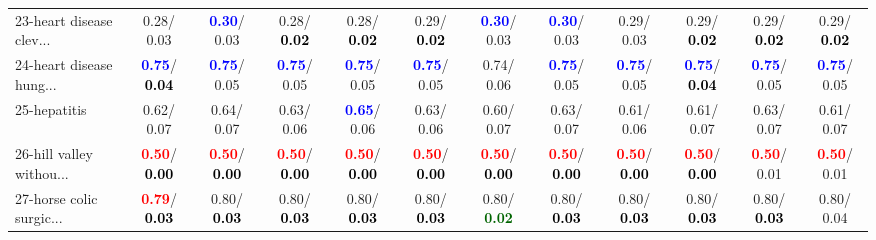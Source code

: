 \begin{table}[h]
\begin{center}
{\begin{tabular}{lc|c|c|c|c|c|c|c|c|c|c}
23-heart disease clev... &   0.28/  0.03 & \textcolor{blue}{\textbf{  0.30}}/  0.03 &   0.28/\textcolor{black}{\textbf{  0.02}} &   0.28/\textcolor{black}{\textbf{  0.02}} &   0.29/\textcolor{black}{\textbf{  0.02}} & \textcolor{blue}{\textbf{  0.30}}/  0.03 & \textcolor{blue}{\textbf{  0.30}}/  0.03 &   0.29/  0.03 &   0.29/\textcolor{black}{\textbf{  0.02}} &   0.29/\textcolor{black}{\textbf{  0.02}} &   0.29/\textcolor{black}{\textbf{  0.02}} \\
24-heart disease hung... & \textcolor{blue}{\textbf{  0.75}}/\textcolor{black}{\textbf{  0.04}} & \textcolor{blue}{\textbf{  0.75}}/  0.05 & \textcolor{blue}{\textbf{  0.75}}/  0.05 & \textcolor{blue}{\textbf{  0.75}}/  0.05 & \textcolor{blue}{\textbf{  0.75}}/  0.05 &   0.74/  0.06 & \textcolor{blue}{\textbf{  0.75}}/  0.05 & \textcolor{blue}{\textbf{  0.75}}/  0.05 & \textcolor{blue}{\textbf{  0.75}}/\textcolor{black}{\textbf{  0.04}} & \textcolor{blue}{\textbf{  0.75}}/  0.05 & \textcolor{blue}{\textbf{  0.75}}/  0.05 \\
25-hepatitis &   0.62/  0.07 &   0.64/  0.07 &   0.63/  0.06 & \textcolor{blue}{\textbf{  0.65}}/  0.06 &   0.63/  0.06 &   0.60/  0.07 &   0.63/  0.07 &   0.61/  0.06 &   0.61/  0.07 &   0.63/  0.07 &   0.61/  0.07 \\
26-hill valley withou... & \textcolor{red}{\textbf{  0.50}}/\textcolor{black}{\textbf{  0.00}} & \textcolor{red}{\textbf{  0.50}}/\textcolor{black}{\textbf{  0.00}} & \textcolor{red}{\textbf{  0.50}}/\textcolor{black}{\textbf{  0.00}} & \textcolor{red}{\textbf{  0.50}}/\textcolor{black}{\textbf{  0.00}} & \textcolor{red}{\textbf{  0.50}}/\textcolor{black}{\textbf{  0.00}} & \textcolor{red}{\textbf{  0.50}}/\textcolor{black}{\textbf{  0.00}} & \textcolor{red}{\textbf{  0.50}}/\textcolor{black}{\textbf{  0.00}} & \textcolor{red}{\textbf{  0.50}}/\textcolor{black}{\textbf{  0.00}} & \textcolor{red}{\textbf{  0.50}}/\textcolor{black}{\textbf{  0.00}} & \textcolor{red}{\textbf{  0.50}}/  0.01 & \textcolor{red}{\textbf{  0.50}}/  0.01 \\
27-horse colic surgic... & \textcolor{red}{\textbf{  0.79}}/\textcolor{black}{\textbf{  0.03}} &   0.80/\textcolor{black}{\textbf{  0.03}} &   0.80/\textcolor{black}{\textbf{  0.03}} &   0.80/\textcolor{black}{\textbf{  0.03}} &   0.80/\textcolor{black}{\textbf{  0.03}} &   0.80/\textcolor{darkgreen}{\textbf{  0.02}} &   0.80/\textcolor{black}{\textbf{  0.03}} &   0.80/\textcolor{black}{\textbf{  0.03}} &   0.80/\textcolor{black}{\textbf{  0.03}} &   0.80/\textcolor{black}{\textbf{  0.03}} &   0.80/  0.04 \\

\end{tabular}}
\end{center}
\end{table}
